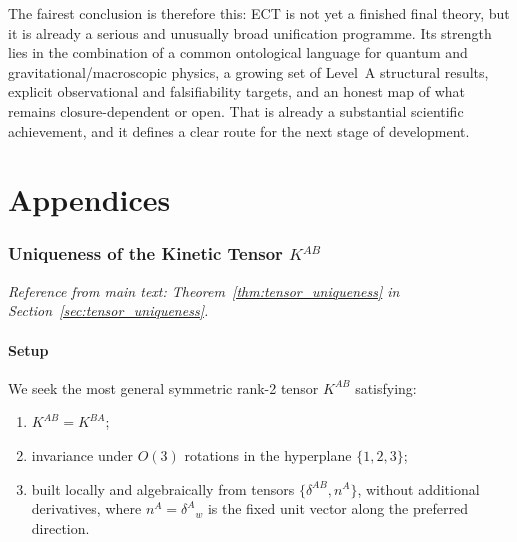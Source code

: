 \documentclass[11pt,a4paper]{article}
\numberwithin{equation}{section}
\begin{document}
The fairest conclusion is therefore this:
ECT is not yet a finished final theory, but it is already a serious and
unusually broad unification programme.
Its strength lies in the combination of a common ontological language
for quantum and gravitational/macroscopic physics, a growing set of
Level~A structural results, explicit observational and falsifiability
targets, and an honest map of what remains closure-dependent or open.
That is already a substantial scientific achievement, and it defines a
clear route for the next stage of development.



\clearpage
\appendix
\renewcommand{\thesection}{\AlphAlph{\value{section}}}
\renewcommand{\thesubsection}{\AlphAlph{\value{section}}.\arabic{subsection}}
\part*{Appendices}



\section{Uniqueness of the Kinetic Tensor $K^{AB}$}
\label{app:tensor_uniqueness}

\textit{Reference from main text: Theorem~\ref{thm:tensor_uniqueness}
in Section~\ref{sec:tensor_uniqueness}.}

\subsection*{Setup}

We seek the most general symmetric rank-2 tensor $K^{AB}$ satisfying:
\begin{enumerate}[label=(\roman*)]
  \item $K^{AB}=K^{BA}$;
  \item invariance under $O(3)$ rotations in the hyperplane $\{1,2,3\}$;
  \item built locally and algebraically from tensors
    $\{\delta^{AB}, n^A\}$, without additional derivatives,
    where $n^A=\delta^A{}_w$ is the fixed unit vector along the preferred direction.
\end{enumerate}
\end{document}
